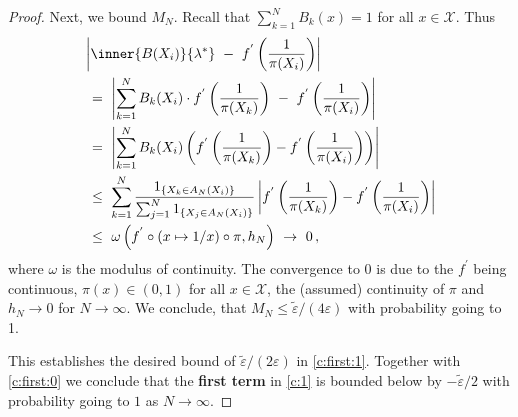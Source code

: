 \begin{proof}
Next, we bound $M_N$.
Recall that $\sum_{k=1}^{N}B_k(x)=1$ for all $x\in\mathcal{X}$. Thus
\begin{align}
  \label{part_trick}
  \begin{split}
  &
\left| 
        \inner
       {B(X_i)}
       {\lambda^*}
       \ 
        -
        \ 
        f^{'}
        \left( 
          \frac{1}{\pi(X_i)}
     \right)
\right|
      \\
      &
      \ 
      =
      \ 
      \left| 
      \sum_{k=1}^{N} 
      B_k(X_i)
      \cdot
        f^{'}
        \left( 
          \frac{1}{\pi(X_k)}
          \right)
      \ 
      -
      \ 
        f^{'}
        \left( 
          \frac{1}{\pi(X_i)}
     \right)
      \right|
      \\
      &
      \ 
      =
      \ 
      \left| 
      \sum_{k=1}^{N} 
      B_k(X_i)
      \left( 
        f^{'}
        \left( 
          \frac{1}{\pi(X_k)}
     \right)
     -
        f^{'}
        \left( 
          \frac{1}{\pi(X_i)}
     \right)
      \right)
      \right|
      \\
      &
      \ 
      \le
      \ 
      \sum_{k=1}^{N} 
      \frac{1_{\left\{ X_k\in A_N(X_i) \right\}}}
      {
        \sum_{j=1}^{N} 
1_{\left\{ X_j\in A_N(X_i) \right\}}
      }
      \left| 
        f^{'}
        \left( 
          \frac{1}{\pi(X_k)}
     \right)
     -
        f^{'}
        \left( 
          \frac{1}{\pi(X_i)}
     \right)
      \right|
      \\
      &
      \ 
      \le
      \ 
      \omega
      \left( f^{'}\circ (x\mapsto1/x)\circ \pi,h_N \right)
      \ 
      \to
      \ 
      0
      \,,
\end{split}
\end{align}
where $\omega$ is the modulus of continuity.
The convergence to 0 is due to the $f^{'}$ being continuous, $\pi(x)\in(0,1)$ for all $x\in\mathcal{X}$, the (assumed) continuity of $\pi$ and $h_N\to 0$ for $N\to\infty$.
We conclude, that $
M_N\le
\tilde{\varepsilon}
/
(4\varepsilon)
$
with probability going to 1.

This establishes the desired bound of 
$
\tilde{\varepsilon}/(2\varepsilon)
$
in \eqref{c:first:1}.
Together with \eqref{c:first:0}
we conclude that the \textbf{first term} 
in
\eqref{c:1}
is bounded below by
$
-
\tilde{\varepsilon}/2
$
with probability going to $1$ as $N\to\infty$.

\end{proof}
